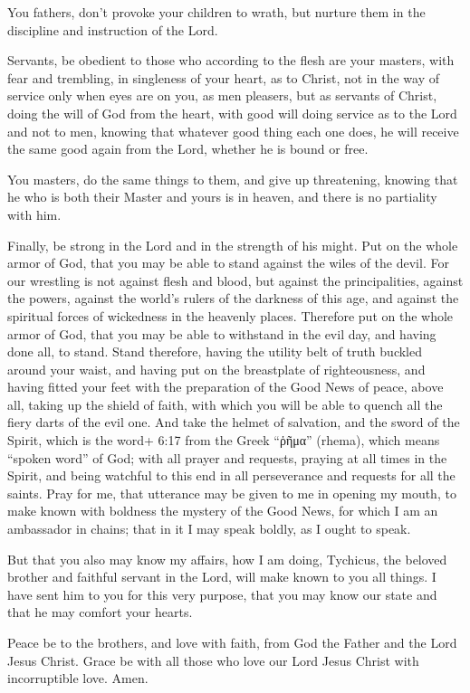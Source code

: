 You fathers, don't provoke your children to wrath, but
nurture them in the discipline and instruction of the Lord.

 Servants, be obedient to those who according to the flesh
are your masters, with fear and trembling, in singleness of your heart,
as to Christ,  not in the way of service only when eyes are
on you, as men pleasers, but as servants of Christ, doing the will of
God from the heart,  with good will doing service as to the
Lord and not to men,  knowing that whatever good thing each
one does, he will receive the same good again from the Lord, whether he
is bound or free.

 You masters, do the same things to them, and give up
threatening, knowing that he who is both their Master and yours is in
heaven, and there is no partiality with him.

 Finally, be strong in the Lord and in the strength of his
might.  Put on the whole armor of God, that you may be able
to stand against the wiles of the devil.  For our wrestling
is not against flesh and blood, but against the principalities, against
the powers, against the world's rulers of the darkness of this age, and
against the spiritual forces of wickedness in the heavenly places.
 Therefore put on the whole armor of God, that you may be
able to withstand in the evil day, and having done all, to stand.
 Stand therefore, having the utility belt of truth buckled
around your waist, and having put on the breastplate of righteousness,
 and having fitted your feet with the preparation of the
Good News of peace,  above all, taking up the shield of
faith, with which you will be able to quench all the fiery darts of the
evil one.  And take the helmet of salvation, and the sword
of the Spirit, which is the word+ 6:17 from the Greek ``ῥῆμα'' (rhema),
which means ``spoken word'' of God;  with all prayer and
requests, praying at all times in the Spirit, and being watchful to this
end in all perseverance and requests for all the saints. 
Pray for me, that utterance may be given to me in opening my mouth, to
make known with boldness the mystery of the Good News,  for
which I am an ambassador in chains; that in it I may speak boldly, as I
ought to speak.

 But that you also may know my affairs, how I am doing,
Tychicus, the beloved brother and faithful servant in the Lord, will
make known to you all things.  I have sent him to you for
this very purpose, that you may know our state and that he may comfort
your hearts.

 Peace be to the brothers, and love with faith, from God
the Father and the Lord Jesus Christ.  Grace be with all
those who love our Lord Jesus Christ with incorruptible love. Amen.
